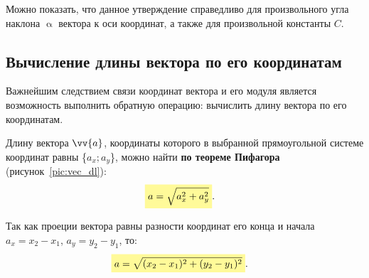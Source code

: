 Можно показать, что данное утверждение справедливо для произвольного угла наклона $\upalpha$ вектора
к оси координат, а также для произвольной константы $C$.

\clearpage

\subsection{Вычисление длины вектора по его координатам}

Важнейшим следствием связи координат вектора и его модуля
является возможность выполнить обратную операцию:
вычислить длину вектора по его координатам.

Длину вектора $\vv{a}$, координаты которого в выбранной
прямоугольной системе координат равны \{$a_x; a_y$\}, можно
найти \textbf{по теореме Пифагора} (рисунок~\ref{pic:vec_dl}):
\begin{align}
  &\hly{a = \sqrt{a_x^2 + a_y^2}}.
\end{align}

Так как проеции вектора равны разности координат его конца и начала
$a_x = x_2 - x_1$, $a_y = y_2 - y_1$, то:
\begin{align}
  &\hly{a = \sqrt{(x_2 - x_1)^2 + (y_2 - y_1)^2}}.
\end{align}

